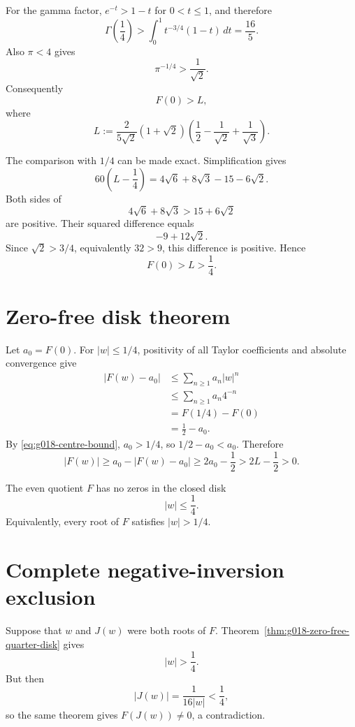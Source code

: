 For the gamma factor, $e^{-t}>1-t$ for $0<t\le1$, and therefore
\[
 \Gamma\!\left(\frac14\right)
 >
 \int_0^1t^{-3/4}(1-t)\,dt
 =\frac{16}{5}.
\]
Also $\pi<4$ gives
\[
 \pi^{-1/4}>\frac1{\sqrt2}.
\]
Consequently
\[
 F(0)>L,
\]
where
\[
 L:=\frac{2}{5\sqrt2}(1+\sqrt2)
 \left(\frac12-\frac1{\sqrt2}+\frac1{\sqrt3}\right).
\]

The comparison with $1/4$ can be made exact.  Simplification gives
\[
 60\left(L-\frac14\right)
 =4\sqrt6+8\sqrt3-15-6\sqrt2.
\]
Both sides of
\[
 4\sqrt6+8\sqrt3>15+6\sqrt2
\]
are positive.  Their squared difference equals
\[
 -9+12\sqrt2.
\]
Since $\sqrt2>3/4$, equivalently $32>9$, this difference is positive.  Hence
\begin{equation}
 \boxed{F(0)>L>\frac14}.
 \label{eq:g018-centre-bound}
\end{equation}

\section{Zero-free disk theorem}

Let $a_0=F(0)$.  For $|w|\le1/4$, positivity of all Taylor coefficients and absolute convergence give
\[
 \begin{aligned}
 |F(w)-a_0|
 &\le\sum_{n\ge1}a_n|w|^n\\
 &\le\sum_{n\ge1}a_n4^{-n}\\
 &=F(1/4)-F(0)\\
 &=\frac12-a_0.
 \end{aligned}
\]
By \eqref{eq:g018-centre-bound}, $a_0>1/4$, so $1/2-a_0<a_0$.  Therefore
\[
 |F(w)|
 \ge a_0-|F(w)-a_0|
 \ge2a_0-\frac12
 >2L-\frac12
 >0.
\]

\begin{theorem}
\label{thm:g018-zero-free-quarter-disk}
The even quotient $F$ has no zeros in the closed disk
\[
 \boxed{|w|\le\frac14}.
\]
Equivalently, every root of $F$ satisfies $|w|>1/4$.
\end{theorem}

\section{Complete negative-inversion exclusion}

Suppose that $w$ and $J(w)$ were both roots of $F$.  Theorem~\ref{thm:g018-zero-free-quarter-disk} gives
\[
 |w|>\frac14.
\]
But then
\[
 |J(w)|=\frac{1}{16|w|}<\frac14,
\]
so the same theorem gives $F(J(w))\ne0$, a contradiction.

